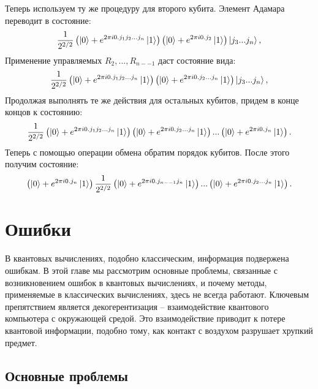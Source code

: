 \documentclass[12pt,a4paper]{article}
\begin{document}
	Теперь используем ту же процедуру для второго кубита. Элемент Адамара переводит в состояние:\\
	\begin{equation}
		\frac{1}{2^{2/2}}\left(\ket{0}+e^{2\pi i0.j_{1}j_{2}...j_{n}}\ket{1}\right)\left(\ket{0}+e^{2\pi i0.j_{2}}\ket{1}\right)\ket{j_{3}...j_{n}},
	\end{equation}
	Применение управляемых $R_{2},...,R_{n--1}$ даст состояние вида:\\
	\begin{equation}
		\frac{1}{2^{2/2}}\left(\ket{0}+e^{2\pi i0.j_{1}j_{2}...j_{n}}\ket{1}\right)\left(\ket{0}+e^{2\pi i0.j_{2}...j_{n}}\ket{1}\right)\ket{j_{3}...j_{n}},
	\end{equation}
	Продолжая выполнять те же действия для остальных кубитов, придем в конце концов к состоянию:\\
	\begin{equation}
		\frac{1}{2^{2/2}}\left(\ket{0}+e^{2\pi i0.j_{1}j_{2}...j_{n}}\ket{1}\right)\left(\ket{0}+e^{2\pi i0.j_{2}...j_{n}}\ket{1}\right)...\left(\ket{0}+e^{2\pi i0.j_{n}}\ket{1}\right).
	\end{equation}
	Теперь с помощью операции обмена обратим порядок кубитов. После этого получим состояние:\\
	
	\begin{equation}\left(\ket{0}+e^{2\pi i0.j_{n}}\ket{1}\right)
		\frac{1}{2^{2/2}}\left(\ket{0}+e^{2\pi i0.j_{n--1}j_{n}}\ket{1}\right)...\left(\ket{0}+e^{2\pi i0.j_{2}...j_{n}}\ket{1}\right).
	\end{equation}
	
	\section{Ошибки}
	В квантовых вычислениях, подобно классическим, информация подвержена ошибкам. В этой главе мы рассмотрим основные проблемы, связанные с возникновением ошибок в квантовых вычислениях, и почему методы, применяемые в классических вычислениях, здесь не всегда работают. Ключевым препятствием является декогерентизация – взаимодействие квантового компьютера с окружающей средой. Это взаимодействие приводит к потере квантовой информации, подобно тому, как контакт с воздухом разрушает хрупкий предмет.
	\subsection{Основные проблемы}
	
\end{document}
